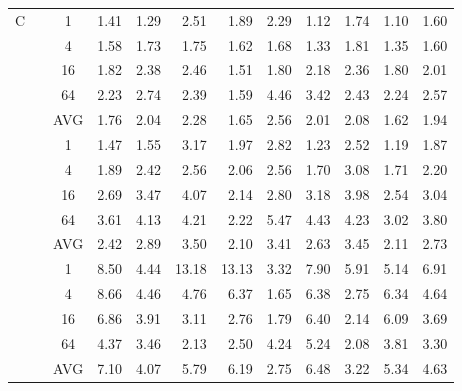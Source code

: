 \begin{table}[!b]
\begin{center}
{\begin{tabular}{|c|c|c|n{2}{1}n{2}{1}n{2}{1}n{2}{1}n{2}{1}n{2}{1}n{2}{1}n{2}{1}|n{2}{1}|}
  &  & 1  & 1.41 & 1.29 &  2.51 &  1.89 & 2.29 & 1.12 & 1.74 & 1.10 & 1.60 \\
 & & 4   & 1.58 & 1.73 &  1.75 &  1.62 & 1.68 & 1.33 & 1.81 & 1.35 & 1.60 \\
 & & 16  & 1.82 & 2.38 &  2.46 &  1.51 & 1.80 & 2.18 & 2.36 & 1.80 & 2.01 \\
 & & 64  & 2.23 & 2.74 &  2.39 &  1.59 & 4.46 & 3.42 & 2.43 & 2.24 & 2.57 \\ 
 & & AVG & 1.76 & 2.04 &  2.28 &  1.65 & 2.56 & 2.01 & 2.08 & 1.62 & {\boldmath}1.94 \\ 
 &  & 1 & 1.47 & 1.55 &  3.17 &  1.97 & 2.82 & 1.23 & 2.52 & 1.19 & 1.87 \\
 & & 4   & 1.89 & 2.42 &  2.56 &  2.06 & 2.56 & 1.70 & 3.08 & 1.71 & 2.20 \\
 & & 16  & 2.69 & 3.47 &  4.07 &  2.14 & 2.80 & 3.18 & 3.98 & 2.54 & 3.04 \\
 & & 64  & 3.61 & 4.13 &  4.21 &  2.22 & 5.47 & 4.43 & 4.23 & 3.02 & 3.80 \\ 
 & & AVG & 2.42 & 2.89 &  3.50 &  2.10 & 3.41 & 2.63 & 3.45 & 2.11 & {\boldmath}2.73 \\ 
 &  & 1 & 8.50 & 4.44 & 13.18 & 13.13 & 3.32 & 7.90 & 5.91 & 5.14 & 6.91 \\
 & & 4   & 8.66 & 4.46 &  4.76 &  6.37 & 1.65 & 6.38 & 2.75 & 6.34 & 4.64 \\
 & & 16  & 6.86 & 3.91 &  3.11 &  2.76 & 1.79 & 6.40 & 2.14 & 6.09 & 3.69 \\
 & & 64  & 4.37 & 3.46 &  2.13 &  2.50 & 4.24 & 5.24 & 2.08 & 3.81 & 3.30 \\ 
 & & AVG & 7.10 & 4.07 &  5.79 &  6.19 & 2.75 & 6.48 & 3.22 & 5.34 & {\boldmath}4.63 \\ \hline
\end{tabular}}
\npnoround
\end{center}
\end{table}

\fi
